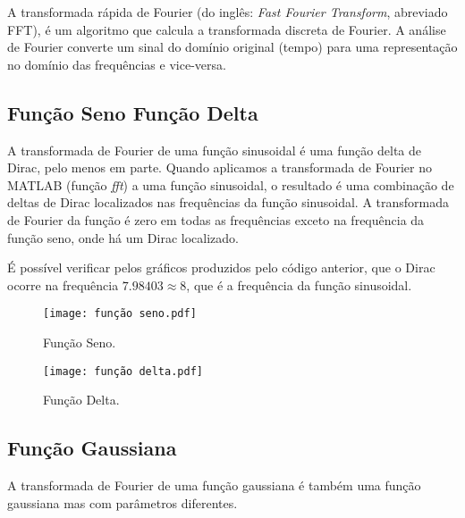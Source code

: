 A transformada rápida de Fourier (do inglês: \emph{Fast Fourier Transform}, abreviado FFT), é um algoritmo que calcula a transformada discreta de Fourier. A análise de Fourier converte um sinal do domínio original (tempo) para uma representação no domínio das frequências e vice-versa.

\subsection{Função Seno \boldmath{$\rightarrow$} Função Delta} 

A transformada de Fourier de uma função sinusoidal é uma função delta de Dirac, pelo menos em parte. Quando aplicamos a transformada de Fourier no MATLAB (função \emph{fft}) a uma função sinusoidal, o resultado é uma combinação de deltas de Dirac localizados nas frequências da função sinusoidal. A transformada de Fourier da função é zero em todas as frequências exceto na frequência da função seno, onde há um Dirac localizado.

\newpara


\newpage

É possível verificar pelos gráficos produzidos pelo código anterior, que o Dirac ocorre na frequência $7.98403\approx 8$, que é a frequência da função sinusoidal.

\begin{figure}[!ht]
    \centering
    \begin{minipage}[b]{0.49\textwidth}
        \centering
        \texttt{[image: função seno.pdf]}
        \caption{Função Seno.}
    \end{minipage}
    \hfill
    \begin{minipage}[b]{0.49\textwidth}
        \centering
        \texttt{[image: função delta.pdf]}
        \caption{Função Delta.}
    \end{minipage}
\end{figure}

\subsection{Função Gaussiana}

A transformada de Fourier de uma função gaussiana é também uma função gaussiana mas com parâmetros diferentes.

\newpara


